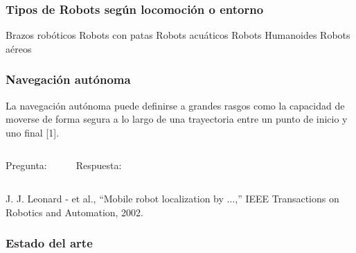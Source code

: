 \begin{frame}
    \frametitle{Tipos de Robots según locomoción o entorno}
    
    Brazos robóticos
    Robots con patas
    Robots acuáticos
    Robots Humanoides
    Robots aéreos
    
\end{frame}


\begin{frame}
    \frametitle{Navegación autónoma}
    \begin{block}{}
        La navegación autónoma puede definirse a grandes rasgos como la capacidad de moverse de forma segura a lo largo de una trayectoria entre un punto de inicio y uno final [1].
    \end{block}
    \vspace{5mm}
    \begin{columns}
        \hspace{13pt}Pregunta:
        \begin{enumerate}
        \end{enumerate}
        Respuesta:
        \begin{enumerate}[$\rightarrow$]
        \end{enumerate}
    \end{columns}
    \vfill
    \begin{tiny}
        [1] J. J. Leonard - et al., ``Mobile robot localization by ...,'' IEEE Transactions on Robotics and Automation, 2002.
    \end{tiny}
\end{frame}


\begin{frame}
    \frametitle{Estado del arte}
    
    

\end{frame}